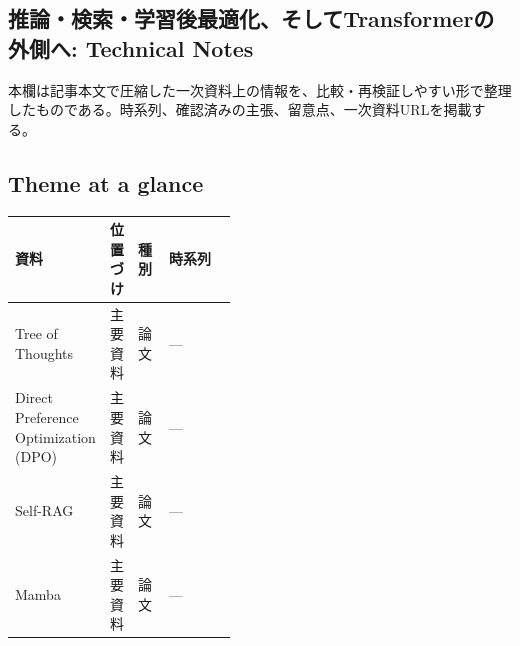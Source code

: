 \subsection*{推論・検索・学習後最適化、そしてTransformerの外側へ: Technical Notes}
本欄は記事本文で圧縮した一次資料上の情報を、比較・再検証しやすい形で整理したものである。時系列、確認済みの主張、留意点、一次資料URLを掲載する。
\smallskip
{}\par
\medskip
\subsection*{Theme at a glance}
\begin{center}
\footnotesize
\begin{tabularx}{\linewidth}{@{}p{0.20\linewidth}p{0.10\linewidth}p{0.14\linewidth}X@{}}
\toprule
資料 & 位置づけ & 種別 & 時系列 \\
\midrule
Tree of Thoughts & 主要資料 & 論文 & — \\
Direct Preference Optimization (DPO) & 主要資料 & 論文 & — \\
Self-RAG & 主要資料 & 論文 & — \\
Mamba & 主要資料 & 論文 & — \\
\bottomrule
\end{tabularx}
\end{center}
\normalsize

